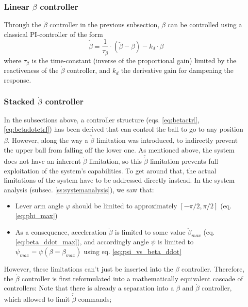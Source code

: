 \documentclass{article}
\begin{document}
\subsubsection{Linear \texorpdfstring{$\beta$}{beta} controller}
Through the $\dot{\beta}$ controller in the previous subsection, $\beta$ can be controlled using a classical PI-controller of the form
\begin{equation}
\breve{\dot{\beta}} = \frac{1}{\tau_{\beta}} \cdot \left( \breve{\beta} - \beta \right) - k_d \cdot \dot{\beta}
\label{eq:betactrl}
\end{equation}
where $\tau_{\beta}$ is the time-constant (inverse of the proportional gain) limited by the reactiveness of the $\dot{\beta}$ controller, and $k_d$ the derivative gain for dampening the response.

\subsubsection{Stacked \texorpdfstring{$\dot{\beta}$}{betadot} controller}
In the subsections above, a controller structure (eqs. \ref{eq:betactrl}, \ref{eq:betadotctrl}) has been derived that can control the ball to go to any position $\beta$.
However, along the way a $\breve{\dot{\beta}}$ limitation was introduced, to indirectly prevent the upper ball from falling off the lower one.
As mentioned above, the system does not have an inherent $\dot{\beta}$ limitation, so this $\breve{\dot{\beta}}$ limitation prevents full exploitation of the system's capabilities.
To get around that, the actual limitations of the system have to be addressed directly instead.
In the system analysis (subsec. \ref{ss:systemanalysis}), we saw that:
\begin{itemize}
	\item{Lever arm angle $\varphi$ should be limited to approximately $[-\pi/2, \pi/2]$ (eq. \ref{eq:phi_max})}
	\item{As a consequence, acceleration $\ddot{\beta}$ is limited to some value $\ddot{\beta}_{max}$ (eq. \ref{eq:beta_ddot_max}), and accordingly angle $\psi$ is limited to $\psi_{max} = \psi\left(\ddot{\beta} = \ddot{\beta}_{max} \right)$ using eq. \ref{eq:psi_vs_beta_ddot}}
\end{itemize}
However, these limitations can't just be inserted into the $\dot{\beta}$ controller.
Therefore, the $\dot{\beta}$ controller is first reformulated into a mathematically equivalent cascade of controllers:
Note that there is already a separation into a $\beta$ and $\dot{\beta}$ controller, which allowed to limit $\breve{\dot{\beta}}$ commands;
\end{document}
